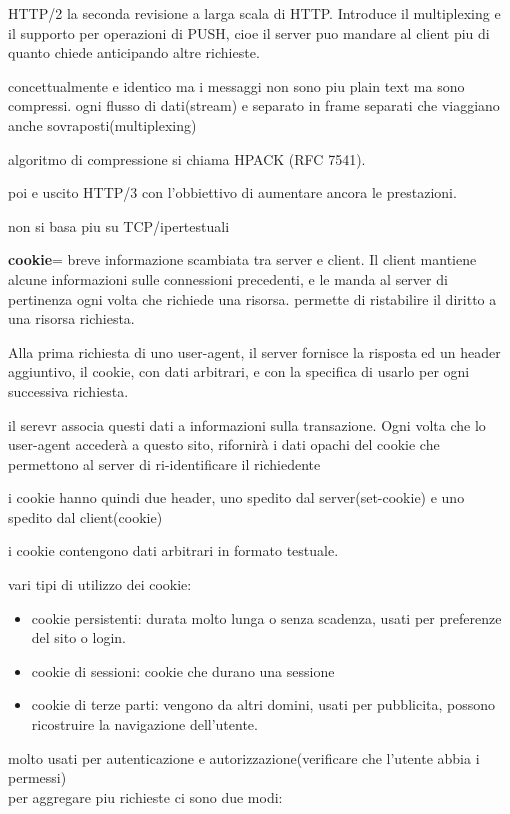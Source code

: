 \documentclass[12pt]{article}
\begin{document}
HTTP/2 la seconda revisione a larga scala di HTTP.
Introduce il multiplexing e il supporto per operazioni di PUSH, cioe il server puo mandare al client piu di quanto chiede anticipando altre richieste.

concettualmente e identico ma i messaggi non sono piu plain text ma sono compressi.
ogni flusso di dati(stream) e separato in frame separati che viaggiano anche sovraposti(multiplexing)

algoritmo di compressione si chiama HPACK (RFC 7541).

poi e uscito HTTP/3 con l'obbiettivo di aumentare ancora le prestazioni.

non si basa piu su TCP/ipertestuali

\textbf{cookie}= breve informazione scambiata tra server e client. Il client mantiene alcune informazioni sulle connessioni precedenti, e
le manda al server di pertinenza ogni volta che richiede una risorsa. permette di ristabilire il diritto a una risorsa richiesta.

Alla prima richiesta di uno user-agent, il server fornisce la risposta
ed un header aggiuntivo, il cookie, con dati arbitrari, e con la
specifica di usarlo per ogni successiva richiesta.

il serevr associa questi dati a informazioni sulla transazione. Ogni volta che lo user-agent accederà a questo sito, rifornirà i dati
opachi del cookie che permettono al server di ri-identificare il
richiedente

i cookie hanno quindi due header, uno spedito dal server(set-cookie) e uno spedito dal client(cookie)

i cookie contengono dati arbitrari in formato testuale.

vari tipi di utilizzo dei cookie:
\begin{itemize}
\item cookie persistenti: durata molto lunga o senza scadenza, usati per preferenze del sito o login.
\item cookie di sessioni: cookie che durano una sessione
\item cookie di terze parti: vengono da altri domini, usati per pubblicita, possono ricostruire la navigazione dell'utente. 
\end{itemize}

molto usati per autenticazione e autorizzazione(verificare che l'utente abbia i permessi)\\

per aggregare piu richieste ci sono due modi:
\end{document}
